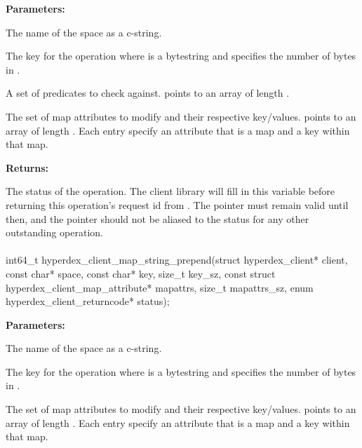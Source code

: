 \noindent\textbf{Parameters:}
\begin{description}[labelindent=\widthof{{\code{mapattrs}, \code{mapattrs\_sz}}},leftmargin=*,noitemsep,nolistsep,align=right]
\item[\code{space}] The name of the space as a c-string.
\item[\code{key}, \code{key\_sz}] The key for the operation where  is a bytestring and  specifies the number of bytes in .
\item[\code{checks}, \code{checks\_sz}] A set of predicates to check against.   points to an array of length .
\item[\code{mapattrs}, \code{mapattrs\_sz}] The set of map attributes to modify and their respective key/values.   points to an array of length .  Each entry specify an attribute that is a map and a key within that map.
\end{description}

\noindent\textbf{Returns:}
\begin{description}[labelindent=\widthof{{\code{status}}},leftmargin=*,noitemsep,nolistsep,align=right]
\item[\code{status}] The status of the operation.  The client library will fill in this variable before returning this operation's request id from .  The pointer must remain valid until then, and the pointer should not be aliased to the status for any other outstanding operation.
\end{description}

\paragraph{}
\begin{ccode}
int64_t hyperdex_client_map_string_prepend(struct hyperdex_client* client,
                const char* space,
                const char* key, size_t key_sz,
                const struct hyperdex_client_map_attribute* mapattrs, size_t mapattrs_sz,
                enum hyperdex_client_returncode* status);
\end{ccode}
\funcdesc 

\noindent\textbf{Parameters:}
\begin{description}[labelindent=\widthof{{\code{mapattrs}, \code{mapattrs\_sz}}},leftmargin=*,noitemsep,nolistsep,align=right]
\item[\code{space}] The name of the space as a c-string.
\item[\code{key}, \code{key\_sz}] The key for the operation where  is a bytestring and  specifies the number of bytes in .
\item[\code{mapattrs}, \code{mapattrs\_sz}] The set of map attributes to modify and their respective key/values.   points to an array of length .  Each entry specify an attribute that is a map and a key within that map.
\end{description}


